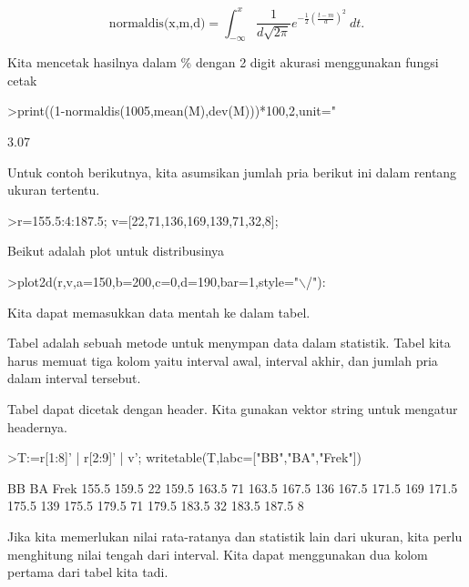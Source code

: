 \documentclass{article}
\begin{document}
\begin{eulernotebook}
\begin{eulercomment}
\end{eulercomment}
\begin{eulerformula}
\[
\text{normaldis(x,m,d)}=\int_{-\infty}^x \frac{1}{d\sqrt{2\pi}}e^{-\frac{1}{2}(\frac{t-m}{d})^2}\ dt.
\]
\end{eulerformula}
\begin{eulercomment}
Kita mencetak hasilnya dalam \% dengan 2 digit akurasi menggunakan
fungsi cetak
\end{eulercomment}
\begin{eulerprompt}
>print((1-normaldis(1005,mean(M),dev(M)))*100,2,unit=" %
\end{eulerprompt}
\begin{euleroutput}
        3.07 %
\end{euleroutput}
\begin{eulercomment}
Untuk contoh berikutnya, kita asumsikan jumlah pria berikut ini dalam
rentang ukuran tertentu.
\end{eulercomment}
\begin{eulerprompt}
>r=155.5:4:187.5; v=[22,71,136,169,139,71,32,8];
\end{eulerprompt}
\begin{eulercomment}
Beikut adalah plot untuk distribusinya
\end{eulercomment}
\begin{eulerprompt}
>plot2d(r,v,a=150,b=200,c=0,d=190,bar=1,style="\(\backslash\)/"):
\end{eulerprompt}
\begin{eulercomment}
Kita dapat memasukkan data mentah ke dalam tabel.

Tabel adalah sebuah metode untuk menympan data dalam statistik. Tabel
kita harus memuat tiga kolom yaitu interval awal, interval akhir, dan
jumlah pria dalam interval tersebut.

Tabel dapat dicetak dengan header. Kita gunakan vektor string untuk
mengatur headernya.
\end{eulercomment}
\begin{eulerprompt}
>T:=r[1:8]' | r[2:9]' | v'; writetable(T,labc=["BB","BA","Frek"])
\end{eulerprompt}
\begin{euleroutput}
          BB        BA      Frek
       155.5     159.5        22
       159.5     163.5        71
       163.5     167.5       136
       167.5     171.5       169
       171.5     175.5       139
       175.5     179.5        71
       179.5     183.5        32
       183.5     187.5         8
\end{euleroutput}
\begin{eulercomment}
Jika kita memerlukan nilai rata-ratanya dan statistik lain dari
ukuran, kita perlu menghitung nilai tengah dari interval. Kita dapat
menggunakan dua kolom pertama dari tabel kita tadi.


\end{eulercomment}
\end{eulernotebook}
\end{document}
